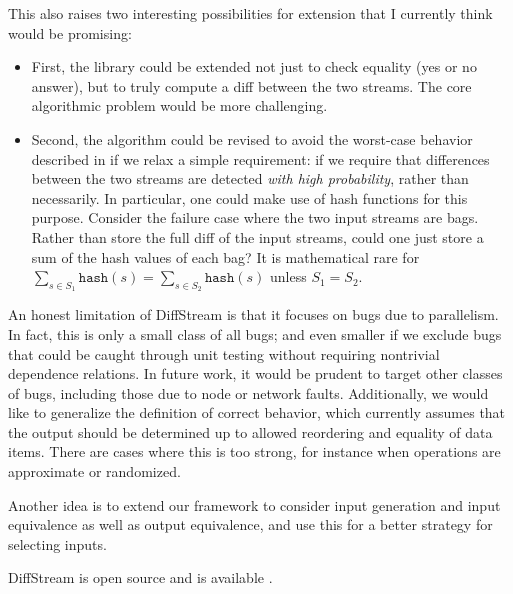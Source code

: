This also raises two interesting possibilities for extension that I currently think would be promising:
\begin{itemize}
  \item First, the library could be extended not just to check equality (yes or no answer), but to truly compute a diff between the two streams. The core algorithmic problem would be more challenging.
  \item Second, the algorithm could be revised to avoid the worst-case behavior described in  if we relax a simple requirement: if we require that differences between the two streams are detected \emph{with high probability}, rather than necessarily. In particular, one could make use of hash functions for this purpose. Consider the failure case where the two input streams are bags. Rather than store the full diff of the input streams, could one just store a sum of the hash values of each bag? It is mathematical rare for $\sum_{s \in S_1} \texttt{hash}(s) = \sum_{s \in S_2} \texttt{hash}(s)$ unless $S_1 = S_2$.
\end{itemize}

An honest limitation of DiffStream is that it focuses on bugs due to parallelism. In fact, this is only a small class of all bugs; and even smaller if we exclude bugs that could be caught through unit testing without requiring nontrivial dependence relations. In future work, it would be prudent to target other classes of bugs, including those due to node or network faults.
Additionally, we would like to generalize the definition of correct behavior, which currently assumes that the output should be determined up to allowed reordering and equality of data items. There are cases where this is too strong, for instance when operations are approximate or randomized.

Another idea is to extend our framework to consider input generation and input equivalence as well as output equivalence, and use this for a better strategy for selecting inputs.

DiffStream is open source and is available .
